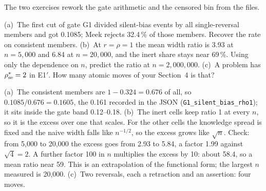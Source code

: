 The two exercises rework the gate arithmetic and the censored bin from the files.

\begin{exercicio}[metodo=calculation,conceito=censura-degenerescencia]
(a)~The first cut of gate G1 divided silent-bias events by all single-reversal members and got
0.1085; Meek rejects 32.4\,\% of those members. Recover the rate on consistent members.
(b)~At $r = \rho = 1$ the mean width ratio is 3.93 at $n = 5{,}000$ and 6.84 at $n = 20{,}000$,
and the inert share stays near 69\,\%. Using only the dependence on $n$, predict the ratio at
$n = 2{,}000{,}000$.
(c)~A problem has $\rho^{*}_{\mathrm{se}} = 2$ in E1$'$. How many atomic moves of your
Section~4 is that?
\end{exercicio}
\begin{solucao}
(a)~The consistent members are $1 - 0.324 = 0.676$ of all, so $0.1085 / 0.676 = 0.1605$, the 0.161
recorded in the JSON (\texttt{G1\_silent\_bias\_rho1}); it sits inside the gate band 0.12--0.18.
(b)~The inert cells keep ratio 1 at every $n$, so it is the excess over one that scales. For the
other cells the knowledge spread is fixed and the naive width falls like $n^{-1/2}$, so the excess
grows like $\sqrt{n}$. Check: from 5,000 to 20,000 the excess goes from 2.93 to 5.84, a factor
1.99 against $\sqrt{4} = 2$. A further factor 100 in $n$ multiplies the excess by 10: about 58.4,
so a mean ratio near 59. This is an extrapolation of the functional form; the largest $n$ measured
is 20,000.
(c)~Two reversals, each a retraction and an assertion: four moves.
\end{solucao}

